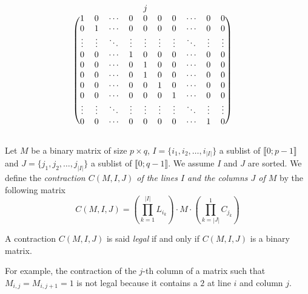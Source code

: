 \begin{definition}
$$\begin{blockarray}{ccccccccccc}
 & & & & j & & & & &\\
\begin{block}{(cccccccccc)c}
1      &  0     & \cdots & 0      & 0 & 0 &  0  & \cdots & 0 & 0 &\\
0      &  1     & \cdots & 0      & 0 & 0 &  0  & \cdots & 0 & 0 &\\
\vdots & \vdots & \ddots & \vdots & \vdots & \vdots &  \vdots  & \ddots & \vdots  & \vdots  &\\
0      &   0    &\cdots  & 1      & 0 & 0 &  0  & \cdots & 0 & 0 &\\ 
0      &   0    &\cdots  & 0      & 1 & 0 &  0  & \cdots & 0 & 0 &\\ 
0      &   0    &\cdots  & 0      & 1 & 0 &  0  & \cdots & 0 & 0 &\\
0      &   0    &\cdots  & 0      & 0 & 1 &  0  & \cdots & 0 & 0 &\\ 
0      &   0    &\cdots  & 0      & 0 & 0  &  1 & \cdots & 0 & 0 &\\
\vdots      &   \vdots    &\ddots  & \vdots     & \vdots & \vdots & \vdots & \ddots & \vdots & \vdots  &\\
0      &   0    &\cdots  & 0      & 0 & 0      &   0    &\cdots  & 1      & 0 &\\
\end{block}
\end{blockarray}
$$
\end{definition}

\begin{definition}
Let $M$ be a binary matrix of size $p \times q$, $I = \{i_1, i_2, \dots, i_{|I|}\}$ a sublist of $\llbracket 0;p-1 \rrbracket$ and $J = \{j_1, j_2, \dots, j_{|I|}\}$ a sublist of $\llbracket 0;q-1 \rrbracket$. We assume $I$ and $J$ are sorted. We define the \emph{contraction $C(M,I,J)$ of the lines $I$ and the columns $J$ of $M$} by the following matrix
$$
C(M,I,J) = \left(\prod\limits_{k = 1}^{|I|} L_{i_k}\right) \cdot M \cdot \left(\prod\limits_{k = |J|}^{1} C_{j_k}\right)
$$
\end{definition}

\begin{definition}
	A contraction $C(M,I,J)$ is said \emph{legal} if and only if $C(M,I,J)$ is a binary matrix.
\end{definition}

For example, the contraction of the $j$-th column of a matrix such that $M_{i,j} = M_{i,j+1} = 1$ is not legal because it contains a $2$ at line $i$ and column $j$.

